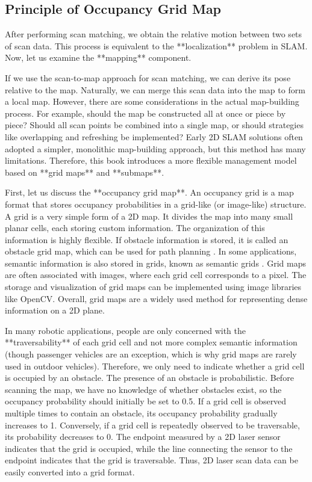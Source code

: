 \subsection{Principle of Occupancy Grid Map}  
After performing scan matching, we obtain the relative motion between two sets of scan data. This process is equivalent to the **localization** problem in SLAM. Now, let us examine the **mapping** component.  

If we use the scan-to-map approach for scan matching, we can derive its pose relative to the map. Naturally, we can merge this scan data into the map to form a local map. However, there are some considerations in the actual map-building process. For example, should the map be constructed all at once or piece by piece? Should all scan points be combined into a single map, or should strategies like overlapping and refreshing be implemented? Early 2D SLAM solutions often adopted a simpler, monolithic map-building approach, but this method has many limitations. Therefore, this book introduces a more flexible management model based on **grid maps** and **submaps**.  

First, let us discuss the **occupancy grid map**. An occupancy grid is a map format that stores occupancy probabilities in a grid-like (or image-like) structure. A grid is a very simple form of a 2D map. It divides the map into many small planar cells, each storing custom information. The organization of this information is highly flexible. If obstacle information is stored, it is called an obstacle grid map, which can be used for path planning \cite{Tsardoulias2016}. In some applications, semantic information is also stored in grids, known as semantic grids \cite{Qi2020}. Grid maps are often associated with images, where each grid cell corresponds to a pixel. The storage and visualization of grid maps can be implemented using image libraries like OpenCV. Overall, grid maps are a widely used method for representing dense information on a 2D plane.  

In many robotic applications, people are only concerned with the **traversability** of each grid cell and not more complex semantic information (though passenger vehicles are an exception, which is why grid maps are rarely used in outdoor vehicles). Therefore, we only need to indicate whether a grid cell is occupied by an obstacle. The presence of an obstacle is probabilistic. Before scanning the map, we have no knowledge of whether obstacles exist, so the occupancy probability should initially be set to 0.5. If a grid cell is observed multiple times to contain an obstacle, its occupancy probability gradually increases to 1. Conversely, if a grid cell is repeatedly observed to be traversable, its probability decreases to 0. The endpoint measured by a 2D laser sensor indicates that the grid is occupied, while the line connecting the sensor to the endpoint indicates that the grid is traversable. Thus, 2D laser scan data can be easily converted into a grid format.  


